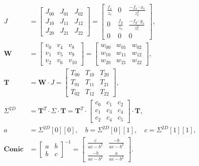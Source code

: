 \begin{equation}
    \begin{aligned}
        J &= \begin{bmatrix}
        J_{00} & J_{01} & J_{02}\\
        J_{10} & J_{11} & J_{12}\\
        J_{20} & J_{21} & J_{22}
        \end{bmatrix} = \begin{bmatrix}
        \frac{f_x}{z_c} & 0 & \frac{-f_x\cdot x_c}{z_c^2}\\
        0 & \frac{f_y}{z_c} & \frac{-f_y\cdot y_c}{z_c^2}\\
        0 & 0 & 0
        \end{bmatrix},\\
         \textbf{W} &= \begin{bmatrix}
        v_{0} & v_{4} & v_{8} \\
        v_{1} & v_{5} & v_{9} \\
        v_{2} & v_{6} & v_{10}
        \end{bmatrix}= \begin{bmatrix}
        w_{00} & w_{01} & w_{02} \\
        w_{10} & w_{11} & w_{12} \\
        w_{20} & w_{21} & w_{22}
        \end{bmatrix},\\ 
        \textbf{T}&=\textbf{W}\cdot J=\begin{bmatrix}
        T_{00} & T_{10} & T_{20} \\
        T_{01} & T_{11} & T_{21} \\
        T_{02} & T_{12} & T_{22}
        \end{bmatrix},\\
        \Sigma^{2D}&=\textbf{T}^T\cdot\Sigma\cdot \textbf{T}=\textbf{T}^T\cdot\begin{bmatrix}
        c_{0} & c_{1} & c_{2} \\
        c_{1} & c_{3} & c_{4} \\
        c_{2} & c_{4} & c_{5}
        \end{bmatrix}\cdot \textbf{T},\\
        a&=\Sigma^{2D}[0][0],\quad b=\Sigma^{2D}[0][1],\quad c=\Sigma^{2D}[1][1],\\
        \textbf{Conic}&=\begin{bmatrix}
            a & b\\
            b & c
        \end{bmatrix}^{-1}=\begin{bmatrix}
            \frac{c}{ac-b^2} & \frac{-b}{ac-b^2}\\
            \frac{-b}{ac-b^2} & \frac{a}{ac-b^2}
        \end{bmatrix}.
    \end{aligned}
\end{equation}

